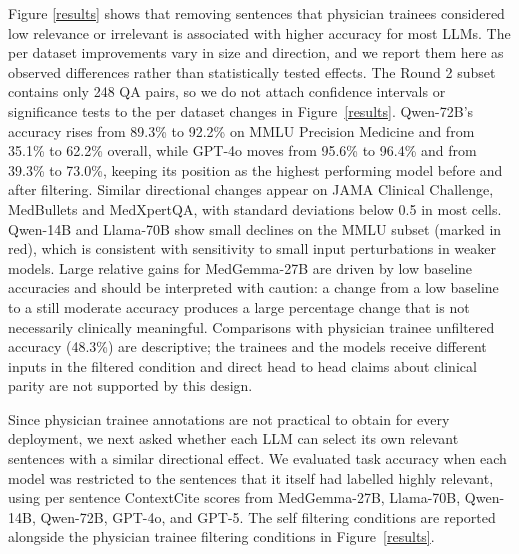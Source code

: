 \documentclass[fleqn,10pt]{wlscirep}
\begin{document}
Figure \ref{results} shows that removing sentences that physician trainees considered low relevance or irrelevant is associated with higher accuracy for most LLMs. The per dataset improvements vary in size and direction, and we report them here as observed differences rather than statistically tested effects. The Round 2 subset contains only 248 QA pairs, so we do not attach confidence intervals or significance tests to the per dataset changes in Figure~\ref{results}. Qwen-72B’s accuracy rises from 89.3\% to 92.2\% on MMLU Precision Medicine and from 35.1\% to 62.2\% overall, while GPT-4o moves from 95.6\% to 96.4\% and from 39.3\% to 73.0\%, keeping its position as the highest performing model before and after filtering. Similar directional changes appear on JAMA Clinical Challenge, MedBullets and MedXpertQA, with standard deviations below 0.5 in most cells. Qwen-14B and Llama-70B show small declines on the MMLU subset (marked in red), which is consistent with sensitivity to small input perturbations in weaker models. Large relative gains for MedGemma-27B are driven by low baseline accuracies and should be interpreted with caution: a change from a low baseline to a still moderate accuracy produces a large percentage change that is not necessarily clinically meaningful. Comparisons with physician trainee unfiltered accuracy (48.3\%) are descriptive; the trainees and the models receive different inputs in the filtered condition and direct head to head claims about clinical parity are not supported by this design.



Since physician trainee annotations are not practical to obtain for every deployment, we next asked whether each LLM can select its own relevant sentences with a similar directional effect. We evaluated task accuracy when each model was restricted to the sentences that it itself had labelled highly relevant, using per sentence ContextCite scores from MedGemma-27B, Llama-70B, Qwen-14B, Qwen-72B, GPT-4o, and GPT-5. The self filtering conditions are reported alongside the physician trainee filtering conditions in Figure~\ref{results}.
\end{document}
